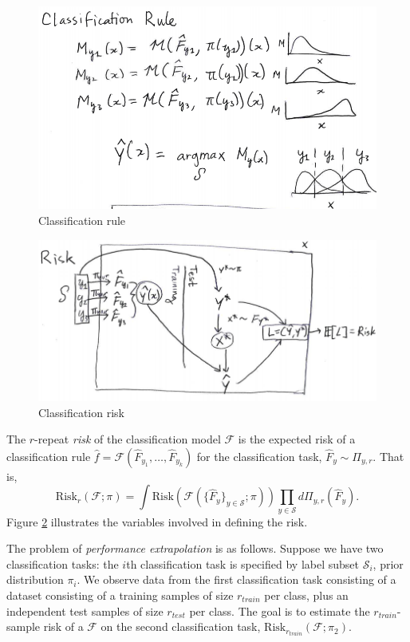 \documentclass[12pt]{article}
\begin{document}
\begin{figure}[h]
\centering
\includegraphics[scale = 0.4]{extrapolation_figures/classification_rule.png}
\caption{Classification rule}\label{fig:classification_rule}
\end{figure}

\begin{figure}[h]
\centering
\includegraphics[scale = 0.4]{extrapolation_figures/risk.png}
\caption{Classification risk}\label{fig:risk}
\end{figure}

The $r$-repeat \emph{risk} of the classification model $\mathcal{F}$
is the expected risk of a classification rule $\hat{f} =
\mathcal{F}(\hat{F}_{y_1},\hdots, \hat{F}_{y_k})$ for the
classification task, $\hat{F}_y \sim \Pi_{y, r}$.  That is,
\[
\text{Risk}_r(\mathcal{F}; \pi) =
\int \text{Risk}(\mathcal{F}(\{\hat{F}_y\}_{y \in \mathcal{S}};
\pi)) \prod_{y \in \mathcal{S}} d\Pi_{y, r}(\hat{F}_y).
\]
Figure \ref{fig:risk} illustrates the variables involved in defining
the risk.

The problem of \emph{performance extrapolation} is as follows.
Suppose we have two classification tasks: the $i$th classification
task is specified by label subset $\mathcal{S}_i$, prior distribution
$\pi_i$.  We observe data from the first classification task
consisting of a dataset consisting of a training samples of size
$r_{train}$ per class, plus an independent test samples of size
$r_{test}$ per class.  The goal is to estimate the $r_{train}$-sample
risk of a $\mathcal{F}$ on the second classification task,
$\text{Risk}_{r_{train}}(\mathcal{F}; \pi_2)$.
\end{document}
